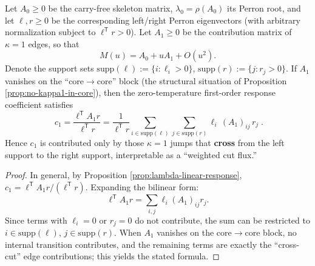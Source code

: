 \begin{proposition}[Support-cut (cut-flux) formula: first-order flux when \texorpdfstring{$\kappa=1$}{kappa=1} is absent from the core interior]\label{prop:c1-cut-flux}
Let \(A_0\ge 0\) be the carry-free skeleton matrix, \(\lambda_0=\rho(A_0)\) its Perron root, and let \(\ell,r\ge 0\) be the corresponding left/right Perron eigenvectors (with arbitrary normalization subject to \(\ell^{\mathsf T}r>0\)).
Let \(A_1\ge 0\) be the contribution matrix of \(\kappa=1\) edges, so that
\[
M(u)=A_0+uA_1+O(u^2).
\]
Denote the support sets
\(
\mathrm{supp}(\ell):=\{i:\ell_i>0\}
\),
\(
\mathrm{supp}(r):=\{j:r_j>0\}
\).
If \(A_1\) vanishes on the ``core\(\to\)core'' block (the structural situation of Proposition \ref{prop:no-kappa1-in-core}), then the zero-temperature first-order response coefficient satisfies
\[
\boxed{\;
c_1=\frac{\ell^{\mathsf T}A_1r}{\ell^{\mathsf T}r}
=\frac{1}{\ell^{\mathsf T}r}\sum_{i\in\mathrm{supp}(\ell)}\sum_{j\in\mathrm{supp}(r)}\ell_i\,(A_1)_{ij}\,r_j\; }.
\]
Hence \(c_1\) is contributed only by those \(\kappa=1\) jumps that \textbf{cross} from the left support to the right support, interpretable as a ``weighted cut flux.''
\end{proposition}
\begin{proof}
In general, by Proposition \ref{prop:lambda-linear-response},
\(
c_1=\ell^{\mathsf T}A_1r/(\ell^{\mathsf T}r)
\).
Expanding the bilinear form:
\[
\ell^{\mathsf T}A_1r=\sum_{i,j}\ell_i(A_1)_{ij}r_j.
\]
Since terms with \(\ell_i=0\) or \(r_j=0\) do not contribute, the sum can be restricted to \(i\in\mathrm{supp}(\ell)\), \(j\in\mathrm{supp}(r)\).
When \(A_1\) vanishes on the core\(\to\)core block, no internal transition contributes, and the remaining terms are exactly the ``cross-cut'' edge contributions; this yields the stated formula. \qedhere
\end{proof}
